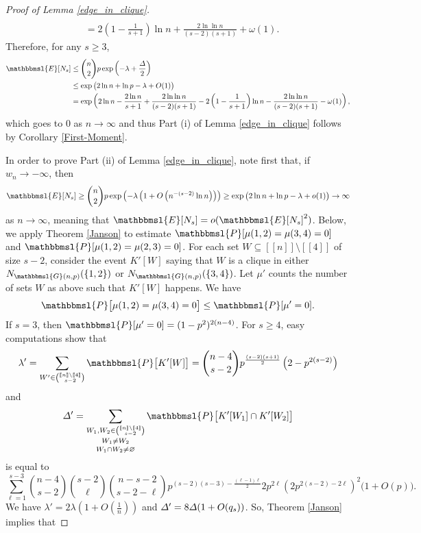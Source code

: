 \documentclass[hidelinks, 11pt]{article}
\theoremstyle{plain}
\theoremstyle{definition}
\begin{document}
\begin{proof}[Proof of Lemma \ref{edge_in_clique}]
\begin{align*}
\\&=2\left(1-\frac{1}{s+1}\right)\ln n+\frac{2\ln\ln n}{(s-2)(s+1)}+\omega(1).
\end{align*}
Therefore, for any $s\geq3$,
\begin{align*}
\mathbbmsl{E}[N_s]&\leq{n\choose 2}p\exp\left(-\lambda+\frac{\mathnormal{\Delta}}{2}\right)\\&\leq\exp\big(2\ln n+\ln p-\lambda+O(1)\big)\\
&=\exp\left(2\ln n-\frac{2\ln n}{s+1}+\frac{2\ln\ln n}{(s-2)(s+1)}-2\left(1-\frac{1}{s+1}\right)\ln n-\frac{2\ln\ln n}{(s-2)(s+1)}-\omega(1)\right),
\end{align*}
which goes to $0$ as $n\to\infty$ and thus  Part (i)  of Lemma \ref{edge_in_clique} follows by Corollary \ref{First-Moment}.


In order  to  prove  Part (ii)  of Lemma \ref{edge_in_clique}, note first that,  if $w_n\to-\infty$, then
$$\mathbbmsl{E}[N_s]\geq{n\choose 2}p\exp\left(-\lambda\left(1+O\left(n^{-(s-2)}\ln n\right)\right)\right)\geq\exp\big(2\ln n+\ln p-\lambda+o(1)\big)\to\infty$$ as $n\to\infty$, meaning that  $\mathbbmsl{E}[N_s]=o(\mathbbmsl{E}[N_s]^2)$.
Below, we   apply   Theorem \ref{Janson} to   estimate $\mathbbmsl{P}[\mu(1,2)=\mu(3,4)=0]$ and $\mathbbmsl{P}[\mu(1,2)=\mu(2,3)=0]$.
For each set $W\subseteq[\![n]\!]\setminus[\![4]\!]$ of size $s-2$, consider the  event $K'[W]$ saying that   $W$ is a clique in either $N_{\mathbbmsl{G}(n,p)}(\{1, 2\})$ or   $N_{\mathbbmsl{G}(n,p)}(\{3, 4\})$.   Let $\mu'$ counts the number of sets $W$ as above such that $K'[W]$ happens. We have
\begin{equation}
\mathbbmsl{P}\big[\mu(1,2)=\mu(3,4)=0\big]\leq\mathbbmsl{P}[\mu'=0].\label{mu-one}
\end{equation}
If $s=3$, then $\mathbbmsl{P}[\mu'=0]=(1-p^2)^{2(n-4)}$. For $s\geq 4$, easy  computations  show that
$$\lambda'=\sum_{W'\in{[\![n]\!]\setminus[\![4]\!]\choose s-2}}\mathbbmsl{P}\big[K'[W]\big]={n-4\choose s-2}p^{\frac{(s-2)(s+1)}{2}}\left(2-p^{2(s-2)}\right)$$   and
$$\mathnormal{\Delta}'=\mathop{\mathop{\sum_{W_1,W_2\in{[\![n]\!]\setminus[\![4]\!]\choose s-2}}}_{W_1\neq W_2}}_{W_1\cap W_2\neq\varnothing}\mathbbmsl{P}\big[K'[W_1]\cap K'[W_2]\big]$$ is equal to $$\sum_{\ell=1}^{s-3}{n-4\choose s-2}{s-2\choose\ell}{n-s-2\choose s-2-\ell}
p^{(s-2)(s-3)-\frac{(\ell-1)\ell}{2}}2p^{2\ell}\left(2p^{2(s-2)-2\ell}\right)^2\big(1+O(p)\big).$$
We have $\lambda'=2\lambda(1+O(\tfrac{1}{n}))$ and $\mathnormal{\Delta}'=8\mathnormal{\Delta}(1+O(q_s))$.
So, Theorem \ref{Janson} implies that

\end{proof}
\end{document}
